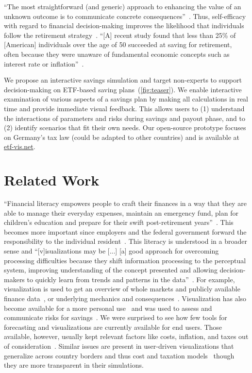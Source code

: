 \documentclass[sigconf%
,natbib=true%
]{acmart}
\begin{document}
\enquote{The most straightforward (and generic) approach to enhancing the value of an unknown outcome is to communicate concrete consequences}~\cite{wiener2008-framework}.
Thus, self-efficacy with regard to financial decision-making improves the likelihood that individuals follow the retirement strategy~\cite{lusardi2017-narratives}.
\enquote{[A] recent study found that less than 25\% of [American] individuals over the age of 50 succeeded at saving for retirement, often because they were unaware of fundamental economic concepts such as interest rate or inflation}~\cite{rudolph2009-finvis}.

We propose an interactive savings simulation and target non-experts to support decision-making on ETF-based saving plans~(\autoref{fig:teaser}).
We enable interactive examination of various aspects of a savings plan by making all calculations in real time and provide immediate visual feedback.
This allows users to (1) understand the interactions of parameters and risks during savings and payout phase, and to (2) identify scenarios that fit their own needs.
Our open-source prototype focuses on Germany's tax law (could be adapted to other countries) and is available at \href{https://etf-vis.net}{etf-vis.net}.

\section{Related Work}
\enquote{Financial literacy empowers people to craft their finances in a way that they are able to manage their everyday expenses, maintain an emergency fund, plan for children's education and prepare for their swift post-retirement years}~\cite{goyal2021-literacy}. 
This becomes more important since employers and the federal government forward the responsibility to the individual resident~\cite{lusardi2017-narratives}.
This literacy is understood in a broader sense and \enquote{[v]isualizations may be [...] [a] good approach for overcoming processing difficulties because they shift information processing to the perceptual system, improving understanding of the concept presented and allowing decision-makers to quickly learn from trends and patterns in the data}~\cite{lusardi2017-narratives}.
For example, visualization is used to get an overview of whole markets and publicly available finance data~\cite{wattenberg1999-stockmarket}, or underlying mechanics and consequences~\cite{fry2013-teaching}.
Visualization has also become available for a more personal use~\cite{huang2015-personal} and was used to assess and communicate risks for savings~\cite{rudolph2009-finvis}.
We were surprised to see how few tools for forecasting and visualizations are currently available for end users.
Those available, however, usually kept relevant factors like costs, inflation, and taxes out of consideration~\cite{saving_plan_extra_etf, saving_plan_black_rock}. 
Similar issues are present in user-driven visualizations that generalize across country borders and thus cost and taxation models~\cite{portfolio-charts} though they are more transparent in their simulations.  
\end{document}
